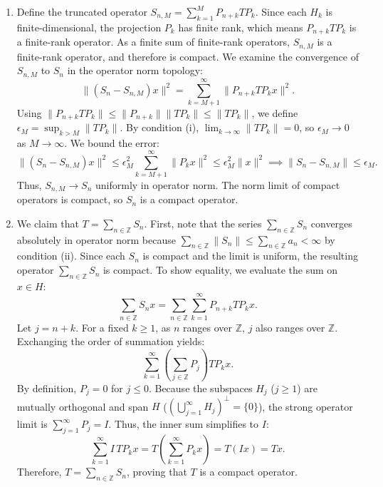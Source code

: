\documentclass{article}
\begin{document}
\begin{enumerate}[label=\fbox{\arabic*}]
\begin{enumerate}[label=(\arabic*)]
          \item Define the truncated operator $S_{n, M} = \sum_{k=1}^M P_{n+k} T P_k$.
          Since each $H_k$ is finite-dimensional, the projection $P_k$ has finite rank, which means $P_{n+k} T P_k$ is a finite-rank operator. 
          As a finite sum of finite-rank operators, $S_{n, M}$ is a finite-rank operator, and therefore is compact.
          We examine the convergence of $S_{n, M}$ to $S_n$ in the operator norm topology:
          \[
            \| (S_n - S_{n, M}) x \|^2 = \sum_{k=M+1}^\infty \|P_{n+k} T P_k x\|^2.
          \]
          Using $\|P_{n+k} T P_k\| \le \|P_{n+k}\| \|T P_k\| \le \|T P_k\|$, we define $\epsilon_M = \sup_{k > M} \|T P_k\|$.
          By condition (i), $\lim_{k \to \infty} \|T P_k\| = 0$, so $\epsilon_M \to 0$ as $M \to \infty$. We bound the error:
          \[
            \| (S_n - S_{n, M}) x \|^2 \le \epsilon_M^2 \sum_{k=M+1}^\infty \|P_k x\|^2 \le \epsilon_M^2 \|x\|^2 \implies \|S_n - S_{n, M}\| \le \epsilon_M.
          \]
          Thus, $S_{n, M} \to S_n$ uniformly in operator norm. The norm limit of compact operators is compact, so $S_n$ is a compact operator.

          \item We claim that $T = \sum_{n \in \mathbb{Z}} S_n$.
          First, note that the series $\sum_{n \in \mathbb{Z}} S_n$ converges absolutely in operator norm because $\sum_{n \in \mathbb{Z}} \|S_n\| \le \sum_{n \in \mathbb{Z}} a_n < \infty$ by condition (ii).
          Since each $S_n$ is compact and the limit is uniform, the resulting operator $\sum_{n \in \mathbb{Z}} S_n$ is compact.
          To show equality, we evaluate the sum on $x \in H$:
          \[
            \sum_{n \in \mathbb{Z}} S_n x = \sum_{n \in \mathbb{Z}} \sum_{k=1}^\infty P_{n+k} T P_k x.
          \]
          Let $j = n+k$. For a fixed $k \ge 1$, as $n$ ranges over $\mathbb{Z}$, $j$ also ranges over $\mathbb{Z}$. Exchanging the order of summation yields:
          \[
            \sum_{k=1}^\infty \left( \sum_{j \in \mathbb{Z}} P_j \right) T P_k x.
          \]
          By definition, $P_j = 0$ for $j \le 0$. Because the subspaces $H_j$ ($j \ge 1$) are mutually orthogonal and span $H$ ($\left(\bigcup_{j=1}^\infty H_j\right)^\perp = \{0\}$), the strong operator limit is $\sum_{j=1}^\infty P_j = I$.
          Thus, the inner sum simplifies to $I$:
          \[
            \sum_{k=1}^\infty I \, T P_k x = T \left( \sum_{k=1}^\infty P_k x \right) = T (I x) = Tx.
          \]
          Therefore, $T = \sum_{n \in \mathbb{Z}} S_n$, proving that $T$ is a compact operator.
        \end{enumerate}


\end{enumerate}
\end{document}

